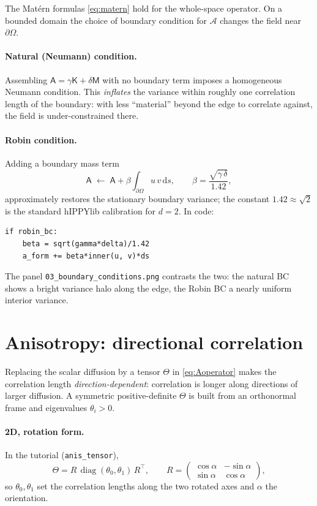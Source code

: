 \documentclass[11pt]{article}
\theoremstyle{definition}
\theoremstyle{plain}
\theoremstyle{remark}
\newcommand{\Ac}{\mathcal{A}}
\newcommand{\dd}{\,\mathrm{d}}
\newcommand{\Mmat}{\mathsf{M}}
\newcommand{\Amat}{\mathsf{A}}
\newcommand{\Kmat}{\mathsf{K}}
\begin{document}
The Mat\'ern formulas \eqref{eq:matern} hold for the whole-space operator. On a
bounded domain the choice of boundary condition for $\Ac$ changes the field
near $\partial\Omega$.

\paragraph{Natural (Neumann) condition.}
Assembling $\Amat = \gamma\Kmat+\delta\Mmat$ with no boundary term imposes a
homogeneous Neumann condition. This \emph{inflates} the variance within roughly
one correlation length of the boundary: with less ``material'' beyond the edge
to correlate against, the field is under-constrained there.

\paragraph{Robin condition.}
Adding a boundary mass term
\begin{equation}
  \Amat \;\leftarrow\; \Amat + \beta \int_{\partial\Omega} u\,v \dd s,
  \qquad
  \beta = \frac{\sqrt{\gamma\,\delta}}{1.42},
  \label{eq:robin}
\end{equation}
approximately restores the stationary boundary variance; the constant
$1.42\approx\sqrt2$ is the standard hIPPYlib calibration for
$d=2$. In code:
\begin{lstlisting}
if robin_bc:
    beta = sqrt(gamma*delta)/1.42
    a_form += beta*inner(u, v)*ds
\end{lstlisting}
The panel \texttt{03\_boundary\_conditions.png} contrasts the two: the natural
BC shows a bright variance halo along the edge, the Robin BC a nearly uniform
interior variance.

\section{Anisotropy: directional correlation}
\label{sec:aniso}

Replacing the scalar diffusion by a tensor $\Theta$ in \eqref{eq:Aoperator}
makes the correlation length \emph{direction-dependent}: correlation is longer
along directions of larger diffusion. A symmetric positive-definite $\Theta$ is
built from an orthonormal frame and eigenvalues $\theta_i>0$.

\paragraph{2D, rotation form.}
In the tutorial (\texttt{anis\_tensor}),
\begin{equation}
  \Theta = R\,\operatorname{diag}(\theta_0,\theta_1)\,R^\top,
  \qquad
  R = \begin{pmatrix}\cos\alpha & -\sin\alpha\\
                     \sin\alpha & \cos\alpha\end{pmatrix},
\end{equation}
so $\theta_0,\theta_1$ set the correlation lengths along the two rotated axes
and $\alpha$ the orientation.
\end{document}
